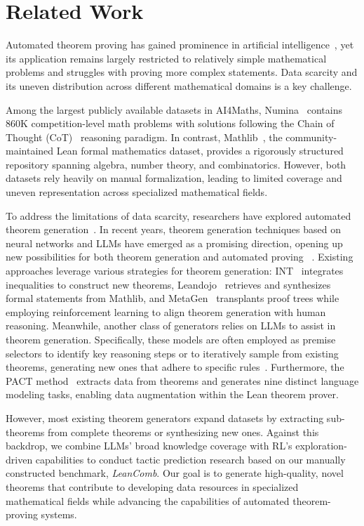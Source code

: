 \section{Related Work}
Automated theorem proving has gained prominence in artificial intelligence~\cite{saxton2019analysing, wang-etal-2023-dt,DBLP:journals/corr/abs-2410-15700}, yet its application remains largely restricted to relatively simple mathematical problems and struggles with proving more complex statements. Data scarcity and its uneven distribution across different mathematical domains is a key challenge.


Among the largest publicly available datasets in AI4Maths, Numina~\cite{li2024numinamath} contains 860K competition-level math problems with solutions following the Chain of Thought (CoT)~\cite{cotgoogle} reasoning paradigm. In contrast, Mathlib~\cite{MathlibCommunity}, the community-maintained Lean formal mathematics dataset, provides a rigorously structured repository spanning algebra, number theory, and combinatorics. However, both datasets rely heavily on manual formalization, leading to limited coverage and uneven representation across specialized mathematical fields.

To address the limitations of data scarcity, researchers have explored automated theorem generation~\cite{piotrowski2018atpboost}. In recent years, theorem generation  techniques based on neural networks and LLMs have emerged as a promising direction, opening up new possibilities for both theorem generation and automated proving ~\cite{gauthier2019deep,r1}.
Existing approaches leverage various strategies for theorem generation: INT~\cite{r1} integrates inequalities to construct new theorems, Leandojo~\cite{r5} retrieves and synthesizes formal statements from Mathlib, and MetaGen~\cite{MetaGen2020} transplants proof trees while employing reinforcement learning to align theorem generation with human reasoning. Meanwhile, another class of generators relies on LLMs to assist in theorem generation. Specifically, these models are often employed as premise selectors to identify key reasoning steps or to iteratively sample from existing theorems, generating new ones that adhere to specific rules~\cite{urban2020first, ds-prover, palermo2022synthetic, polu2020, lime}. Furthermore, the PACT method~\cite{r18} extracts data from theorems and generates nine distinct language modeling tasks, enabling data augmentation within the Lean theorem prover.  
 

However, most existing theorem generators expand datasets by extracting sub-theorems from complete theorems or synthesizing new ones. Against this backdrop, we combine
LLMs’ broad knowledge coverage with RL’s exploration-driven capabilities to conduct tactic prediction research based on our manually constructed benchmark, \textit{LeanComb}.
Our goal is to generate high-quality, novel theorems that contribute to developing data resources in specialized mathematical fields while advancing the capabilities of automated theorem-proving systems.